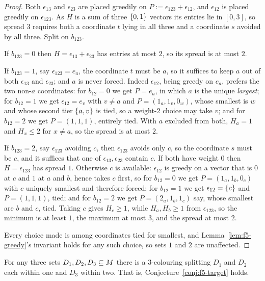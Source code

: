 \begin{proof}
Both $\epsilon_{13}$ and $\epsilon_{23}$ are placed greedily on
$P := \epsilon_{123}+\epsilon_{12}$, and $\epsilon_{12}$ is placed greedily on
$\epsilon_{123}$. As $H$ is a sum of three $\left\{0,1\right\}$ vectors its entries lie in
$[0,3]$, so spread $3$ requires both a coordinate $t$ lying in all three and a
coordinate $s$ avoided by all three. Split on $b_{123}$.

If $b_{123} = 0$ then $H = \epsilon_{13}+\epsilon_{23}$ has entries at most $2$,
so its spread is at most $2$.

If $b_{123} = 1$, say $\epsilon_{123} = e_a$, the coordinate $t$ must be $a$, so
it suffices to keep $a$ out of both $\epsilon_{13}$ and $\epsilon_{23}$; and $a$
is never forced. Indeed $\epsilon_{12}$, being greedy on $e_a$, prefers the two
non-$a$ coordinates: for $b_{12} = 0$ we get $P = e_a$, in which $a$ is the
unique \emph{largest}; for $b_{12} = 1$ we get $\epsilon_{12} = e_v$ with
$v \ne a$ and $P = (1_a, 1_v, 0_w)$, whose smallest is $w$ and whose second tier
$\left\{a,v\right\}$ is tied, so a weight-$2$ choice may take $v$; and for $b_{12} = 2$ we
get $P = (1,1,1)$, entirely tied. With $a$ excluded from both, $H_a = 1$ and
$H_x \le 2$ for $x \ne a$, so the spread is at most $2$.

If $b_{123} = 2$, say $\epsilon_{123}$ avoiding $c$, then $\epsilon_{123}$ avoids
only $c$, so the coordinate $s$ must be $c$, and it suffices that one of
$\epsilon_{13}, \epsilon_{23}$ contain $c$. If both have weight $0$ then
$H = \epsilon_{123}$ has spread $1$. Otherwise $c$ is available: $\epsilon_{12}$
is greedy on a vector that is $0$ at $c$ and $1$ at $a$ and $b$, hence takes $c$
first, so for $b_{12} = 0$ we get $P = (1_a,1_b,0_c)$ with $c$ uniquely smallest
and therefore forced; for $b_{12}=1$ we get $\epsilon_{12} = \left\{c\right\}$ and
$P = (1,1,1)$, tied; and for $b_{12}=2$ we get $P = (2_a,1_b,1_c)$ say, whose
smallest are $b$ and $c$, tied. Taking $c$ gives $H_c \ge 1$, while
$H_a, H_b \ge 1$ from $\epsilon_{123}$, so the minimum is at least $1$, the
maximum at most $3$, and the spread at most $2$.

Every choice made is among coordinates tied for smallest, and
Lemma~\ref{lem:f5-greedy}'s invariant holds for any such choice, so sets $1$ and
$2$ are unaffected.
\end{proof}

\begin{theorem}
\label{thm:f5-target}
For any three sets $D_1,D_2,D_3 \subseteq M$ there is a $3$-colouring
splitting $D_1$ and $D_2$ each within one and $D_3$ within two. That is,
Conjecture~\ref{conj:f5-target} holds.
\end{theorem}

